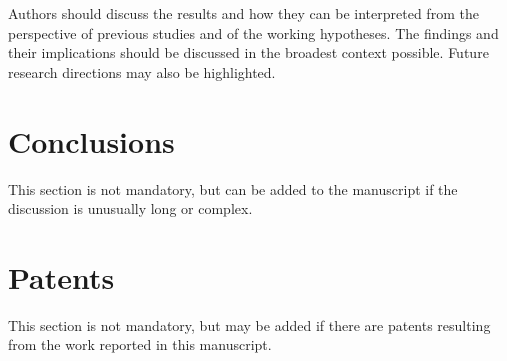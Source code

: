 \documentclass[journal,article,submit,pdftex,moreauthors]{Definitions/mdpi}
\begin{document}
Authors should discuss the results and how they can be interpreted from the perspective of previous studies and of the working hypotheses. The findings and their implications should be discussed in the broadest context possible. Future research directions may also be highlighted.

\section{Conclusions}

This section is not mandatory, but can be added to the manuscript if the discussion is unusually long or complex.

\section{Patents}

This section is not mandatory, but may be added if there are patents resulting from the work reported in this manuscript.

\vspace{6pt} 




\end{document}
